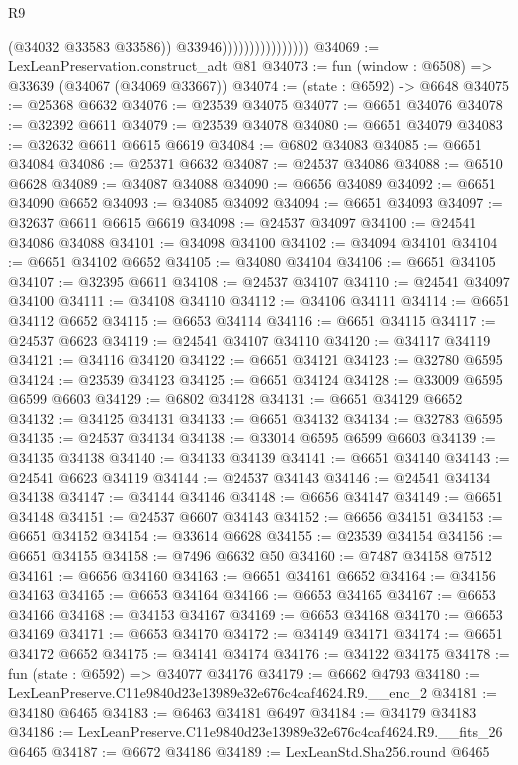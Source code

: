 \begin{lexlean}{R9}
\begin{coremodule}
                                      (@34032 @33583 @33586))
                                    @33946))))))))))))))))
@34069 := LexLeanPreservation.construct_adt @81
@34073 := fun (window : @6508) => @33639 (@34067 (@34069 @33667))
@34074 := (state : @6592) -> @6648
@34075 := @25368 @6632
@34076 := @23539 @34075
@34077 := @6651 @34076
@34078 := @32392 @6611
@34079 := @23539 @34078
@34080 := @6651 @34079
@34083 := @32632 @6611 @6615 @6619
@34084 := @6802 @34083
@34085 := @6651 @34084
@34086 := @25371 @6632
@34087 := @24537 @34086
@34088 := @6510 @6628
@34089 := @34087 @34088
@34090 := @6656 @34089
@34092 := @6651 @34090 @6652
@34093 := @34085 @34092
@34094 := @6651 @34093
@34097 := @32637 @6611 @6615 @6619
@34098 := @24537 @34097
@34100 := @24541 @34086 @34088
@34101 := @34098 @34100
@34102 := @34094 @34101
@34104 := @6651 @34102 @6652
@34105 := @34080 @34104
@34106 := @6651 @34105
@34107 := @32395 @6611
@34108 := @24537 @34107
@34110 := @24541 @34097 @34100
@34111 := @34108 @34110
@34112 := @34106 @34111
@34114 := @6651 @34112 @6652
@34115 := @6653 @34114
@34116 := @6651 @34115
@34117 := @24537 @6623
@34119 := @24541 @34107 @34110
@34120 := @34117 @34119
@34121 := @34116 @34120
@34122 := @6651 @34121
@34123 := @32780 @6595
@34124 := @23539 @34123
@34125 := @6651 @34124
@34128 := @33009 @6595 @6599 @6603
@34129 := @6802 @34128
@34131 := @6651 @34129 @6652
@34132 := @34125 @34131
@34133 := @6651 @34132
@34134 := @32783 @6595
@34135 := @24537 @34134
@34138 := @33014 @6595 @6599 @6603
@34139 := @34135 @34138
@34140 := @34133 @34139
@34141 := @6651 @34140
@34143 := @24541 @6623 @34119
@34144 := @24537 @34143
@34146 := @24541 @34134 @34138
@34147 := @34144 @34146
@34148 := @6656 @34147
@34149 := @6651 @34148
@34151 := @24537 @6607 @34143
@34152 := @6656 @34151
@34153 := @6651 @34152
@34154 := @33614 @6628
@34155 := @23539 @34154
@34156 := @6651 @34155
@34158 := @7496 @6632 @50
@34160 := @7487 @34158 @7512
@34161 := @6656 @34160
@34163 := @6651 @34161 @6652
@34164 := @34156 @34163
@34165 := @6653 @34164
@34166 := @6653 @34165
@34167 := @6653 @34166
@34168 := @34153 @34167
@34169 := @6653 @34168
@34170 := @6653 @34169
@34171 := @6653 @34170
@34172 := @34149 @34171
@34174 := @6651 @34172 @6652
@34175 := @34141 @34174
@34176 := @34122 @34175
@34178 := fun (state : @6592) => @34077 @34176
@34179 := @6662 @4793
@34180 := LexLeanPreserve.C11e9840d23e13989e32e676c4caf4624.R9.__enc_2
@34181 := @34180 @6465
@34183 := @6463 @34181 @6497
@34184 := @34179 @34183
@34186 := LexLeanPreserve.C11e9840d23e13989e32e676c4caf4624.R9.__fits_26 @6465
@34187 := @6672 @34186
@34189 := LexLeanStd.Sha256.round @6465

\end{coremodule}
\end{lexlean}
